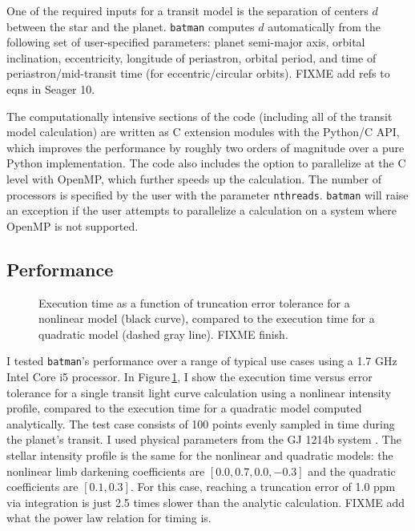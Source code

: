 \documentclass[12pt,preprint]{aastex}
\begin{document}
One of the required inputs for a transit model is the separation of centers $d$ between the star and the planet.  \texttt{batman} computes $d$ automatically from the following set of user-specified parameters: planet semi-major axis, orbital inclination, eccentricity, longitude of periastron, orbital period, and time of periastron/mid-transit time (for eccentric/circular orbits). FIXME add refs to eqns in Seager 10. 

The computationally intensive sections of the code (including all of the transit model calculation) are written as C extension modules with the Python/C API, which improves the performance by roughly two orders of magnitude over a pure Python implementation.  The code also includes the option to parallelize at the C level with OpenMP, which further speeds up the calculation. The number of processors is specified by the user with the parameter \texttt{nthreads}.  \texttt{batman} will raise an exception if the user attempts to parallelize a calculation on a system where OpenMP is not supported.


\subsection{Performance}
\begin{figure}
\caption{Execution time as a function of truncation error tolerance for a nonlinear model (black curve), compared to the execution time for a quadratic model (dashed gray line). FIXME finish.}
\label{fig:performance}
\end{figure}
I tested \texttt{batman}'s performance over a range of typical use cases using a 1.7 GHz Intel Core i5 processor.  In Figure\,\ref{fig:performance}, I show the execution time versus error tolerance for a single transit light curve calculation using a nonlinear intensity profile, compared to the execution time for a quadratic model computed analytically.  The test case consists of 100 points evenly sampled in time during the planet's transit. I used physical parameters from the GJ 1214b system \citep{kreidberg14a}. The stellar intensity profile is the same for the nonlinear and quadratic models: the nonlinear limb darkening coefficients are $[0.0, 0.7, 0.0, -0.3]$ and the quadratic coefficients are $[0.1, 0.3]$.  For this case, reaching a truncation error of 1.0 ppm via integration is just 2.5 times slower than the analytic calculation. FIXME add what the power law relation for timing is.
\end{document}
